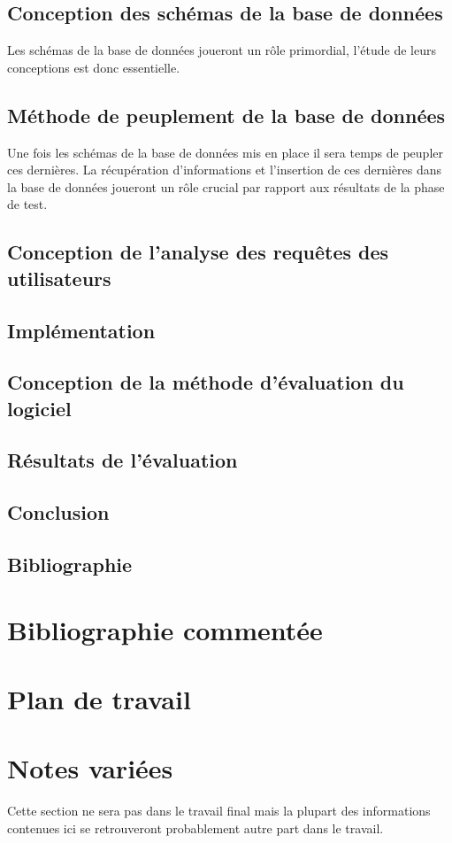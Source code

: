 \documentclass[11pt]{article}
\begin{document}
\subsection{Conception des schémas de la base de données}
Les schémas de la base de données joueront un rôle primordial, l'étude de leurs conceptions est donc essentielle.
\subsection{Méthode de peuplement de la base de données}
Une fois les schémas de la base de données mis en place il sera temps de peupler ces dernières. La récupération d'informations et l'insertion de ces dernières dans la base de données joueront un rôle crucial par rapport aux résultats de la phase de test.
\subsection{Conception de l'analyse des requêtes des utilisateurs}

\subsection{Implémentation}
\subsection{Conception de la méthode d'évaluation du logiciel}
\subsection{Résultats de l'évaluation}
\subsection{Conclusion}
\subsection{Bibliographie}


\section{Bibliographie commentée}

\section{Plan de travail}

\section{Notes variées}
Cette section ne sera pas dans le travail final mais la plupart des informations contenues ici se retrouveront probablement autre part dans le travail.
\end{document}
